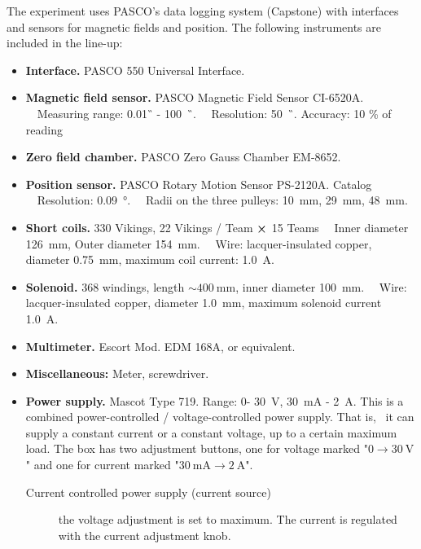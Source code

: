 \documentclass[../Elmag-labhefte-2020.tex]{subfiles}
\begin{document}
The experiment uses PASCO's data logging system (Capstone) with interfaces and sensors for magnetic fields and position.
The following instruments are included in the line-up:
\vspace{-4mm}
\begin{itemize}
    \item \textbf{Interface.} PASCO 550 Universal Interface.
    \item \textbf{Magnetic field sensor.} PASCO Magnetic Field Sensor CI-6520A. \ \
    Measuring range: \SI{0.01}{\G} - \SI{100}{\kilo\G}. \ \
    Resolution: \SI{50}{\milli\G}.
    Accuracy: 10 \% of reading
    \item \textbf{Zero field chamber.} PASCO Zero Gauss Chamber EM-8652.
    \item \textbf{Position sensor.} PASCO Rotary Motion Sensor PS-2120A. Catalog \ \
    Resolution: \SI{0.09}{\degree}. \ \
    Radii on the three pulleys: \SI{10}{\mm}, \SI{29}{\mm}, \SI{48}{\mm}.
    \item \textbf{Short coils.} 330 Vikings, 22 Vikings / Team $\cross$ 15 Teams \ \
    Inner diameter \SI{126}{\mm}, Outer diameter \SI{154}{\mm}. \ \
    Wire: lacquer-insulated copper, diameter \SI{0.75}{\mm}, maximum coil current: \SI{1.0}{\ampere}.
    \item \textbf{Solenoid.} 368 windings, length $\sim \SI{400}{\mm}$, inner diameter \SI{100}{\mm}. \ \
    Wire: lacquer-insulated copper, diameter \SI{1.0}{\mm}, maximum solenoid current \SI{1.0}{\ampere}.
    \item \textbf{Multimeter.} Escort Mod. EDM 168A, or equivalent.
    \item \textbf{Miscellaneous:} Meter, screwdriver.
    \item \textbf{Power supply.} Mascot Type 719. Range: 0- \SI{30}{\volt}, \SI{30}{\milli\ampere} - \SI{2}{\ampere}. \label{magnetfelt.kraftforsyning}
    This is a combined power-controlled / voltage-controlled power supply. That is, \ it can supply a constant current or a constant voltage, up to a certain maximum load. The box has two adjustment buttons, one for voltage marked "$0 \rightarrow \SI{30}{\volt}$" and one for current marked "$\SI{30}{\milli\ampere} \rightarrow \SI{2}{\ampere}$".
    \begin{description}
      \item[Current controlled power supply (current source)] the voltage adjustment is set to maximum. The current is regulated with the current adjustment knob.

\end{description}
\end{itemize}
\end{document}
